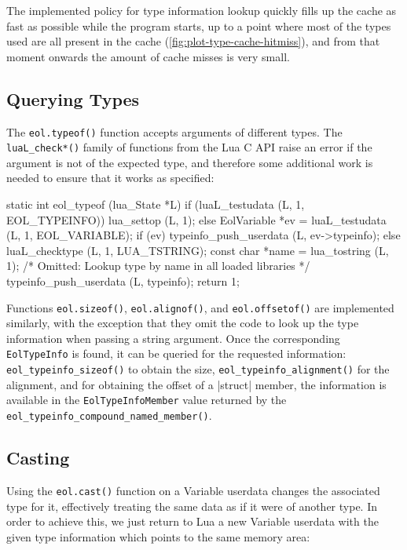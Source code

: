 The implemented policy for type information lookup quickly fills up the cache
as fast as possible while the program starts, up to a point where most of the
types used are all present in the cache
(\autoref{fig:plot-type-cache-hitmiss}), and from that moment onwards the
amount of cache misses is very small. 


\subsection{Querying Types}

The \verb|eol.typeof()| function accepts arguments of different types.
The \verb|luaL_check*()| family of functions from the Lua C API raise an error
if the argument is not of the expected type, and therefore some additional
work is needed to ensure that it works as specified:

\begin{ccode}
static int
eol_typeof (lua_State *L) {
  if (luaL_testudata (L, 1, EOL_TYPEINFO)) {
    lua_settop (L, 1);
  } else {
    EolVariable *ev = luaL_testudata (L, 1, EOL_VARIABLE);
    if (ev) {
      typeinfo_push_userdata (L, ev->typeinfo);
    } else {
      luaL_checktype (L, 1, LUA_TSTRING);
      const char *name = lua_tostring (L, 1);
      /* Omitted: Lookup type by name in all loaded libraries */
      typeinfo_push_userdata (L, typeinfo);
    }
  }
  return 1;
}
\end{ccode}

Functions \verb|eol.sizeof()|, \verb|eol.alignof()|, and \verb|eol.offsetof()|
are implemented similarly, with the exception that they omit the code to
look up the type information when passing a string argument. Once the
corresponding \verb|EolTypeInfo| is found, it can be queried for the requested
information: \verb|eol_typeinfo_sizeof()| to obtain the size,
\verb|eol_typeinfo_alignment()| for the alignment, and for obtaining the
offset of a \Mc|struct| member, the information is available in the
\verb|EolTypeInfoMember| value returned by the
\verb|eol_typeinfo_compound_named_member()|.

\subsection{Casting}

Using the \verb|eol.cast()| function on a \textsf{Variable} userdata changes
the associated type for it, effectively treating the same data as if it were
of another type. In order to achieve this, we just return to Lua a new
\textsf{Variable} userdata with the given type information which points to
the same memory area:

